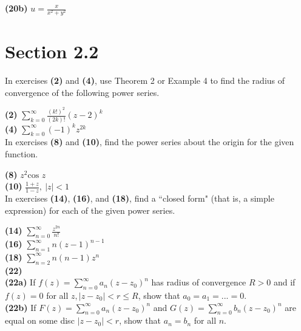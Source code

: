 \documentclass[12pt,letterpaper]{article}
\begin{document}
\textbf{(20b)} \(u = \frac{x}{x^{2} + y^{2}}\) \\
	
	
	
\section*{Section 2.2} 

In exercises \textbf{(2)} and \textbf{(4)}, use Theorem 2 or Example 4 to find the radius of convergence of the following power series.

\textbf{(2)} \(\sum_{k=0}^{\infty}\frac{(k!)^{2}}{(2k)!}(z-2)^{k}\) \\



\textbf{(4)} \(\sum_{k=0}^{\infty}(-1)^{k}z^{2k}\) \\



In exercises \textbf{(8)} and \textbf{(10)}, find the power series about the origin for the given function.

\textbf{(8)} \(z^{2}\text{cos } z\) \\



\textbf{(10)} \(\frac{1+z}{1-z},\ |z|<1\) \\



In exercises \textbf{(14)}, \textbf{(16)}, and \textbf{(18)}, find a ``closed form" (that is, a simple expression) for each of the given power series. 

\textbf{(14)} \(\sum_{n=0}^{\infty} \frac{z^{2n}}{n!}\) \\



\textbf{(16)} \(\sum_{n=1}^{\infty} n(z-1)^{n-1} \) \\



\textbf{(18)} \(\sum_{n = 2}^{\infty} n(n-1)z^{n} \) \\



\textbf{(22)} \\

\textbf{(22a)} If \(f(z) = \sum_{n=0}^{\infty} a_{n}(z-z_{0})^{n}\) has radius of convergence \(R > 0 \) and if \(f(z) = 0\) for all \(z, |z-z_{0}| < r \leq R \), show that \(a_{0} = a_{1} = ... = 0\). \\



\textbf{(22b)} If \(F(z) = \sum_{n=0}^{\infty} a_{n}(z - z_{0})^{n}\) and \(G(z) = \sum_{n=0}^{\infty} b_{n}(z-z_{0})^{n}\) are equal on some disc \(|z - z_{0}|< r\), show that \(a_{n} = b_{n}\) for all \(n\). \\





\textbf{}
\end{document}
